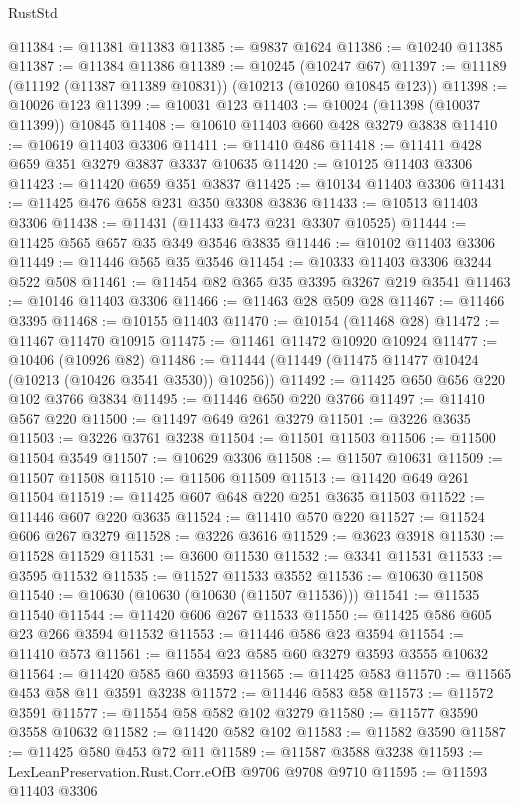 \begin{lexlean}{RustStd}
\begin{coremodule}
{\begin{coremodule}
{{{{{{{{{{{{{{{{{{{{{{{{{{@11384 := @11381 @11383
@11385 := @9837 @1624
@11386 := @10240 @11385
@11387 := @11384 @11386
@11389 := @10245 (@10247 @67)
@11397 := @11189 (@11192 (@11387 @11389 @10831)) (@10213 (@10260 @10845 @123))
@11398 := @10026 @123
@11399 := @10031 @123
@11403 := @10024 (@11398 (@10037 @11399)) @10845
@11408 := @10610 @11403 @660 @428 @3279 @3838
@11410 := @10619 @11403 @3306
@11411 := @11410 @486
@11418 := @11411 @428 @659 @351 @3279 @3837 @3337 @10635
@11420 := @10125 @11403 @3306
@11423 := @11420 @659 @351 @3837
@11425 := @10134 @11403 @3306
@11431 := @11425 @476 @658 @231 @350 @3308 @3836
@11433 := @10513 @11403 @3306
@11438 := @11431 (@11433 @473 @231 @3307 @10525)
@11444 := @11425 @565 @657 @35 @349 @3546 @3835
@11446 := @10102 @11403 @3306
@11449 := @11446 @565 @35 @3546
@11454 := @10333 @11403 @3306 @3244 @522 @508
@11461 := @11454 @82 @365 @35 @3395 @3267 @219 @3541
@11463 := @10146 @11403 @3306
@11466 := @11463 @28 @509 @28
@11467 := @11466 @3395
@11468 := @10155 @11403
@11470 := @10154 (@11468 @28)
@11472 := @11467 @11470 @10915
@11475 := @11461 @11472 @10920 @10924
@11477 := @10406 (@10926 @82)
@11486 := @11444 (@11449 (@11475 @11477 @10424 (@10213 (@10426 @3541 @3530)) @10256))
@11492 := @11425 @650 @656 @220 @102 @3766 @3834
@11495 := @11446 @650 @220 @3766
@11497 := @11410 @567 @220
@11500 := @11497 @649 @261 @3279
@11501 := @3226 @3635
@11503 := @3226 @3761 @3238
@11504 := @11501 @11503
@11506 := @11500 @11504 @3549
@11507 := @10629 @3306
@11508 := @11507 @10631
@11509 := @11507 @11508
@11510 := @11506 @11509
@11513 := @11420 @649 @261 @11504
@11519 := @11425 @607 @648 @220 @251 @3635 @11503
@11522 := @11446 @607 @220 @3635
@11524 := @11410 @570 @220
@11527 := @11524 @606 @267 @3279
@11528 := @3226 @3616
@11529 := @3623 @3918
@11530 := @11528 @11529
@11531 := @3600 @11530
@11532 := @3341 @11531
@11533 := @3595 @11532
@11535 := @11527 @11533 @3552
@11536 := @10630 @11508
@11540 := @10630 (@10630 (@10630 (@11507 @11536)))
@11541 := @11535 @11540
@11544 := @11420 @606 @267 @11533
@11550 := @11425 @586 @605 @23 @266 @3594 @11532
@11553 := @11446 @586 @23 @3594
@11554 := @11410 @573
@11561 := @11554 @23 @585 @60 @3279 @3593 @3555 @10632
@11564 := @11420 @585 @60 @3593
@11565 := @11425 @583
@11570 := @11565 @453 @58 @11 @3591 @3238
@11572 := @11446 @583 @58
@11573 := @11572 @3591
@11577 := @11554 @58 @582 @102 @3279
@11580 := @11577 @3590 @3558 @10632
@11582 := @11420 @582 @102
@11583 := @11582 @3590
@11587 := @11425 @580 @453 @72 @11
@11589 := @11587 @3588 @3238
@11593 := LexLeanPreservation.Rust.Corr.eOfB @9706 @9708 @9710
@11595 := @11593 @11403 @3306
}}}}}}}}}}}}}}}}}}}}}}}}}}
\end{coremodule}}
\end{coremodule}
\end{lexlean}
